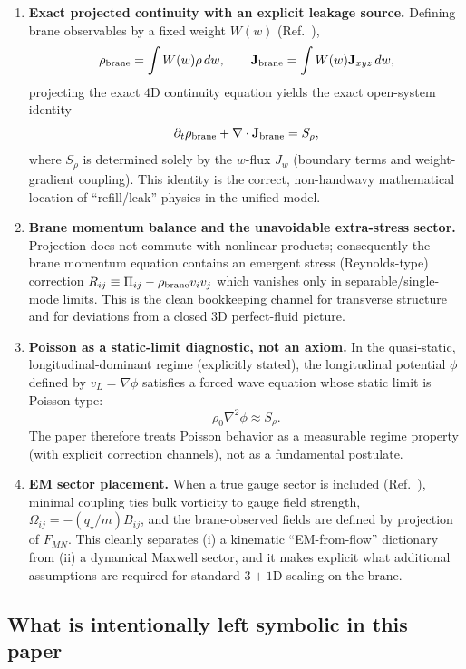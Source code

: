\documentclass[11pt]{article}
\newcommand{\qstar}{q_\star}
\begin{document}
\begin{enumerate}
  \item \textbf{Exact projected continuity with an explicit leakage source.}
  Defining brane observables by a fixed weight \(W(w)\) (Ref.~\cite{norris2026_4d_model}),
  \[
  \rho_{\rm brane}=\int W(w)\rho\,dw,
  \qquad
  \mathbf{J}_{\rm brane}=\int W(w)\mathbf{J}_{xyz}\,dw,
  \]
  projecting the exact \(4\)D continuity equation yields the exact open-system identity
  \[
  \partial_t\rho_{\rm brane}+\nabla\cdot\mathbf{J}_{\rm brane}=S_\rho,
  \]
  where \(S_\rho\) is determined solely by the \(w\)-flux \(J_w\) (boundary terms and weight-gradient coupling). This identity is the correct, non-handwavy mathematical location of ``refill/leak'' physics in the unified model.

  \item \textbf{Brane momentum balance and the unavoidable extra-stress sector.}
  Projection does not commute with nonlinear products; consequently the brane momentum equation contains an emergent stress (Reynolds-type) correction
  \(R_{ij}\equiv \Pi_{ij}-\rho_{\rm brane}v_i v_j\)
  which vanishes only in separable/single-mode limits. This is the clean bookkeeping channel for transverse structure and for deviations from a closed \(3\)D perfect-fluid picture.

  \item \textbf{Poisson as a static-limit diagnostic, not an axiom.}
  In the quasi-static, longitudinal-dominant regime (explicitly stated), the longitudinal potential \(\phi\) defined by \(v_L=\nabla\phi\) satisfies a forced wave equation whose static limit is Poisson-type:
  \[
  \rho_0\nabla^2\phi \approx S_\rho.
  \]
  The paper therefore treats Poisson behavior as a measurable regime property (with explicit correction channels), not as a fundamental postulate.

  \item \textbf{EM sector placement.}
  When a true gauge sector is included (Ref.~\cite{norris2026_4d_model}), minimal coupling ties bulk vorticity to gauge field strength,
  \(\Omega_{ij}=-(\qstar/m)B_{ij}\),
  and the brane-observed fields are defined by projection of \(F_{MN}\). This cleanly separates (i) a kinematic ``EM-from-flow'' dictionary from (ii) a dynamical Maxwell sector, and it makes explicit what additional assumptions are required for standard \(3\!+\!1\)D scaling on the brane.
\end{enumerate}

\subsection{What is intentionally left symbolic in this paper}
\label{sec:open-knobs}
\end{document}
